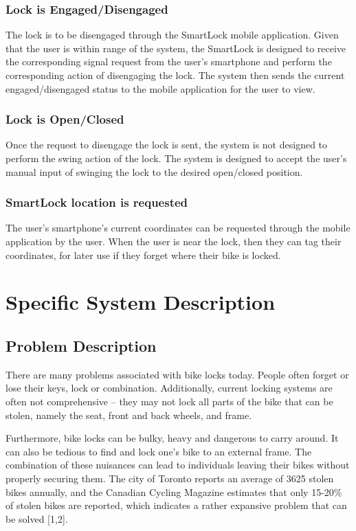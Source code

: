 \documentclass[12pt]{article}
\begin{document}
\subsubsection{Lock is Engaged/Disengaged}
The lock is to be disengaged through the SmartLock mobile application.  Given that the user is within range of the system, the SmartLock is designed to receive the corresponding signal request from the user’s smartphone and perform the corresponding action of disengaging the lock.  The system then sends the current engaged/disengaged status to the mobile application for the user to view.
\subsubsection{Lock is Open/Closed}
Once the request to disengage the lock is sent, the system is not designed to perform the swing action of the lock. The system is designed to accept the user’s manual input of swinging the lock to the desired open/closed position.  
\subsubsection{SmartLock location is requested}
The user’s smartphone's current coordinates can be requested through the mobile application by the user.  When the user is near the lock, then they can tag their coordinates, for later use if they forget where their bike is locked.  

\section{Specific System Description}


\subsection{Problem Description} \label{Sec_pd}

There are many problems associated with bike locks today.  People often forget or lose their keys, lock or combination.  Additionally, current locking systems are often not comprehensive – they may not lock all parts of the bike that can be stolen, namely the seat, front and back wheels, and frame.  


Furthermore, bike locks can be bulky, heavy and dangerous to carry around. It can also be tedious to find and lock one’s bike to an external frame.  The combination of these nuisances can lead to individuals leaving their bikes without properly securing them.  The city of Toronto reports an average of 3625 stolen bikes annually, and the Canadian Cycling Magazine estimates that only 15-20\% of stolen bikes are reported, which indicates a rather expansive problem that can be solved [1,2].  
\end{document}
